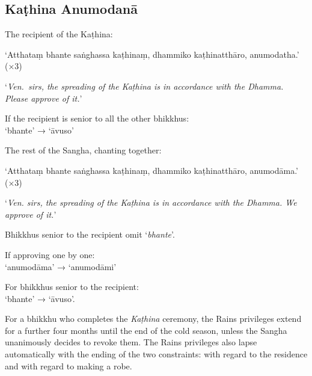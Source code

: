
\subsection{Kaṭhina Anumodanā}
\label{kathina-anumodana}

The recipient of the Kaṭhina:

‘Atthataṃ bhante saṅghassa kaṭhinaṃ, dhammiko kaṭhinatthāro, anumodatha.’ (×3)

‘\emph{Ven.\ sirs, the spreading of the Kaṭhina is in accordance with the Dhamma.
  Please approve of it.}’

If the recipient is senior to all the other bhikkhus:\\
‘bhante’ → ‘āvuso’

The rest of the Sangha, chanting together:

‘Atthataṃ bhante saṅghassa kaṭhinaṃ, dhammiko kaṭhinatthāro, anumodāma.’ (×3)

‘\emph{Ven. sirs, the spreading of the Kaṭhina is in accordance with the Dhamma.
  We approve of it.}’


Bhikkhus senior to the recipient omit ‘\emph{bhante}’.

\ifhandbookedition
\clearpage
\fi

If approving one by one:\\
‘anumodāma’ → ‘anumodāmi’

For bhikkhus senior to the recipient:\\
‘bhante’ → ‘āvuso’.

For a bhikkhu who completes the \emph{Kaṭhina} ceremony, the Rains privileges
extend for a further four months until the end of the cold season, unless the Sangha unanimously decides to revoke them. The Rains privileges also lapse automatically with the ending of the two constraints: with regard to the residence and with regard to making a robe. 



